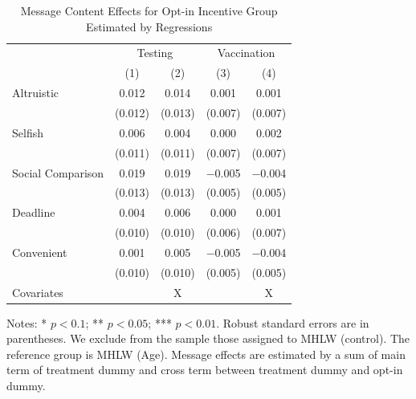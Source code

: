 \documentclass[
]{article}
\begin{document}
\begin{table}

\caption{\label{tab:lh-act-woA}Message Content Effects for Opt-in Incentive Group Estimated by Regressions}
\centering
\fontsize{9}{11}\selectfont
\begin{threeparttable}
\begin{tabular}[t]{lcccc}
\toprule
\multicolumn{1}{c}{ } & \multicolumn{2}{c}{Testing} & \multicolumn{2}{c}{Vaccination} \\
\cmidrule(l{3pt}r{3pt}){2-3} \cmidrule(l{3pt}r{3pt}){4-5}
  & (1) & (2) & (3) & (4)\\
\midrule
Altruistic & \num{0.012} & \num{0.014} & \num{0.001} & \num{0.001}\\
 & (\num{0.012}) & (\num{0.013}) & (\num{0.007}) & (\num{0.007})\\
Selfish & \num{0.006} & \num{0.004} & \num{0.000} & \num{0.002}\\
 & (\num{0.011}) & (\num{0.011}) & (\num{0.007}) & (\num{0.007})\\
Social Comparison & \num{0.019} & \num{0.019} & \num{-0.005} & \num{-0.004}\\
 & (\num{0.013}) & (\num{0.013}) & (\num{0.005}) & (\num{0.005})\\
Deadline & \num{0.004} & \num{0.006} & \num{0.000} & \num{0.001}\\
 & (\num{0.010}) & (\num{0.010}) & (\num{0.006}) & (\num{0.007})\\
Convenient & \num{0.001} & \num{0.005} & \num{-0.005} & \num{-0.004}\\
 & (\num{0.010}) & (\num{0.010}) & (\num{0.005}) & (\num{0.005})\\
Covariates &  & X &  & X\\
\bottomrule
\end{tabular}
\begin{tablenotes}
\item Notes: * $p < 0.1$; ** $p < 0.05$; *** $p < 0.01$. Robust standard errors are in parentheses. We exclude from the sample those assigned to MHLW (control). The reference group is MHLW (Age). Message effects are estimated by a sum of main term of treatment dummy and cross term between treatment dummy and opt-in dummy.
\end{tablenotes}
\end{threeparttable}
\end{table}
\end{document}
